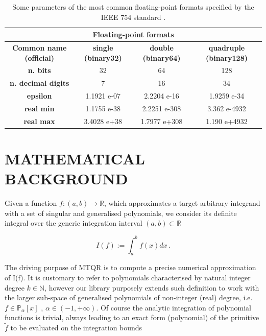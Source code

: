 \documentclass[a4paper, twosided]{book}
\begin{document}
\begin{table}[H]
\centering
\begin{tabular}{|c||c|c|c|}
\hline
\multicolumn{4}{|c|}{\textbf{Floating-point formats}} \\
\hline
\textbf{Common name (official)} & \textbf{single (binary32)} & \textbf{double (binary64)} & \textbf{quadruple (binary128)} \\
\hline
\textbf{n. bits}                & 32          & 64           & 128          \\
\textbf{n. decimal digits}      & 7           & 16           & 34           \\
\textbf{epsilon}                & 1.1921 e-07 & 2.2204 e-16  & 1.9259 e-34  \\
\textbf{real min}               & 1.1755 e-38 & 2.2251 e-308 & 3.362 e-4932 \\
\textbf{real max}               & 3.4028 e+38 & 1.7977 e+308 & 1.190 e+4932 \\
\hline
\end{tabular}
  \caption{Some parameters of the most common floating-point formats specified by the IEEE 754 standard \cite{IEEE754}.}
  \label{table1.1}
\end{table}

\newpage
\section[Mathematical background]{\changefont MATHEMATICAL BACKGROUND}\label{Sec1.2}

\noindent
Given a function $f:(a,b)\to\mathbb{R}$, which approximates a target arbitrary integrand with a set of singular and generalised polynomials, we consider its definite integral over the generic integration interval $(a,b)\subset\mathbb{R}$

\begin{equation}\label{eq1.1}
    I(f):=\int_{a}^{b}f(x)dx\,.
\end{equation}

\noindent
The driving purpose of MTQR is to compute a precise numerical approximation of I(f). It is customary to refer to polynomials characterised by natural integer degree $k\in\mathbb{N}$, however our library purposely extends such definition to work with the larger sub-space of generalised polynomials of non-integer (real) degree, i.e. $f\in\mathbb{P}_{\alpha}[x]$ , $\alpha\in(-1,+\infty)$. Of course the analytic integration of polynomial functions is trivial, always leading to an exact form (polynomial) of the primitive $\tilde{f}$ to be evaluated on the integration bounds
\end{document}
